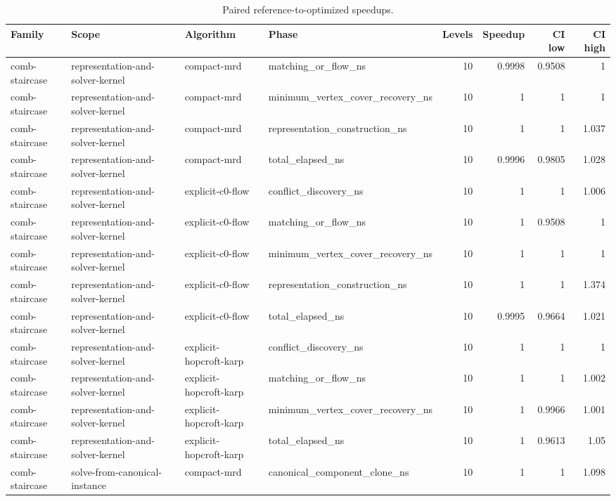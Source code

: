 \begin{table}[t]
\caption{Paired reference-to-optimized speedups.}
\label{tab:kernel-before-after}
\begin{tabular}{llllrrrr}
\toprule
Family & Scope & Algorithm & Phase & Levels & Speedup & CI low & CI high \\
\midrule
comb-staircase & representation-and-solver-kernel & compact-mrd & matching\_or\_flow\_ns & 10 & 0.9998 & 0.9508 & 1 \\
comb-staircase & representation-and-solver-kernel & compact-mrd & minimum\_vertex\_cover\_recovery\_ns & 10 & 1 & 1 & 1 \\
comb-staircase & representation-and-solver-kernel & compact-mrd & representation\_construction\_ns & 10 & 1 & 1 & 1.037 \\
comb-staircase & representation-and-solver-kernel & compact-mrd & total\_elapsed\_ns & 10 & 0.9996 & 0.9805 & 1.028 \\
comb-staircase & representation-and-solver-kernel & explicit-c0-flow & conflict\_discovery\_ns & 10 & 1 & 1 & 1.006 \\
comb-staircase & representation-and-solver-kernel & explicit-c0-flow & matching\_or\_flow\_ns & 10 & 1 & 0.9508 & 1 \\
comb-staircase & representation-and-solver-kernel & explicit-c0-flow & minimum\_vertex\_cover\_recovery\_ns & 10 & 1 & 1 & 1 \\
comb-staircase & representation-and-solver-kernel & explicit-c0-flow & representation\_construction\_ns & 10 & 1 & 1 & 1.374 \\
comb-staircase & representation-and-solver-kernel & explicit-c0-flow & total\_elapsed\_ns & 10 & 0.9995 & 0.9664 & 1.021 \\
comb-staircase & representation-and-solver-kernel & explicit-hopcroft-karp & conflict\_discovery\_ns & 10 & 1 & 1 & 1 \\
comb-staircase & representation-and-solver-kernel & explicit-hopcroft-karp & matching\_or\_flow\_ns & 10 & 1 & 1 & 1.002 \\
comb-staircase & representation-and-solver-kernel & explicit-hopcroft-karp & minimum\_vertex\_cover\_recovery\_ns & 10 & 1 & 0.9966 & 1.001 \\
comb-staircase & representation-and-solver-kernel & explicit-hopcroft-karp & total\_elapsed\_ns & 10 & 1 & 0.9613 & 1.05 \\
comb-staircase & solve-from-canonical-instance & compact-mrd & canonical\_component\_clone\_ns & 10 & 1 & 1 & 1.098 \\

\end{tabular}
\end{table}
